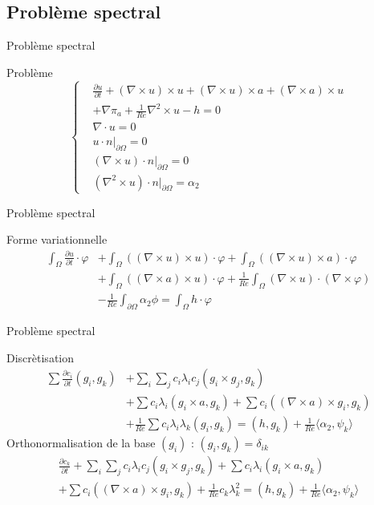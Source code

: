 \documentclass{beamer}
\newcommand{\grad}{{\nabla}}
\newcommand{\rot}{{\nabla\times}}
\newcommand{\rott}{{\nabla^2\times}}
\newcommand{\diverg}{{\nabla\cdot}}
\newcommand{\restr}{{\big\rvert_{\partial\Omega}}}
\begin{document}
\subsection{Problème spectral}
\begin{frame}{Problème spectral}
\begin{block}{Problème}
\[
\left\{
\begin{aligned}
&\frac{\partial u}{\partial t} + (\rot u)\times u + (\rot u)\times a + \left(\rot a\right)\times u \\
&+ \grad\pi_a + \frac{1}{Re}\rott u - h = 0\\
&\diverg u = 0\\
&u\cdot n\restr = 0\\
&(\rot u)\cdot n\restr = 0\\
&(\rott u)\cdot n\restr = \alpha_2
\end{aligned}
\right.
\]
\end{block}
\end{frame}

\begin{frame}{Problème spectral}
\begin{block}{Forme variationnelle}
\begin{align*}
\int_\Omega \frac{\partial u}{\partial t}\cdot \varphi &+ \int_\Omega ((\rot u)\times u)\cdot \varphi + \int_\Omega ((\rot u)\times a)\cdot\varphi \\
&+ \int_\Omega ((\rot a)\times u)\cdot\varphi + \frac{1}{Re}\int_\Omega (\rot u)\cdot(\rot\varphi) \\
&-\frac{1}{Re}\int_{\partial\Omega} \alpha_2\phi = \int_\Omega h\cdot\varphi
\end{align*}
\end{block}
\end{frame}

\begin{frame}{Problème spectral}
\begin{block}{Discrètisation}
\begin{align*}
\sum \frac{\partial c_i}{\partial t}(g_i,g_k) &+ \sum_i\sum_j c_i\lambda_i c_j(g_i\times g_j, g_k) \\
&+ \sum c_i\lambda_i(g_i\times a,g_k) + \sum c_i((\rot a)\times g_i, g_k) \\
&+ \frac{1}{Re}\sum c_i\lambda_i\lambda_k(g_i,g_k) = (h,g_k) + \frac{1}{Re}\langle\alpha_2,\psi_k\rangle
\end{align*}
Orthonormalisation de la base $(g_i)$ : $(g_i,g_k)=\delta_{ik}$
\begin{eqnarray*}
\frac{\partial c_k}{\partial t} + \sum_i\sum_j c_i\lambda_i c_j(g_i\times g_j, g_k) + \sum c_i\lambda_i(g_i\times a,g_k)\\
+ \sum c_i((\rot a)\times g_i, g_k) + \frac{1}{Re}c_k\lambda_k^2 = (h,g_k) + \frac{1}{Re}\langle\alpha_2,\psi_k\rangle
\end{eqnarray*}
\end{block}
\end{frame}
\end{document}
